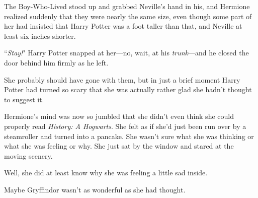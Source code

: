 The Boy-Who-Lived stood up and grabbed Neville's hand in his, and Hermione realized suddenly that they were nearly the same size, even though some part of her had insisted that Harry Potter was a foot taller than that, and Neville at least six inches shorter.

``\emph{Stay!}" Harry Potter snapped at her—no, wait, at his \emph{trunk}—and he closed the door behind him firmly as he left.

She probably should have gone with them, but in just a brief moment Harry Potter had turned so scary that she was actually rather glad she hadn't thought to suggest it.

Hermione's mind was now so jumbled that she didn't even think she could properly read \emph{History: A Hogwarts}. She felt as if she'd just been run over by a steamroller and turned into a pancake. She wasn't sure what she was thinking or what she was feeling or why. She just sat by the window and stared at the moving scenery.

Well, she did at least know why she was feeling a little sad inside.

Maybe Gryffindor wasn't as wonderful as she had thought.

